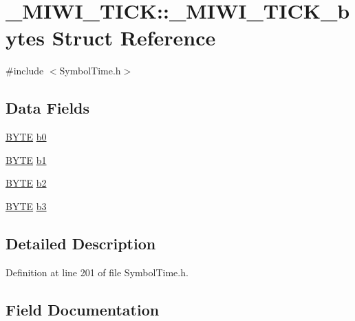 \hypertarget{struct___m_i_w_i___t_i_c_k_1_1___m_i_w_i___t_i_c_k__bytes}{}\section{\+\_\+\+M\+I\+W\+I\+\_\+\+T\+I\+C\+K\+:\+:\+\_\+\+M\+I\+W\+I\+\_\+\+T\+I\+C\+K\+\_\+bytes Struct Reference}
\label{struct___m_i_w_i___t_i_c_k_1_1___m_i_w_i___t_i_c_k__bytes}


{\ttfamily \#include $<$Symbol\+Time.\+h$>$}

\subsection*{Data Fields}
\begin{DoxyCompactItemize}
\item 
\hyperlink{_generic_type_defs_8h_a4ae1dab0fb4b072a66584546209e7d58}{B\+Y\+T\+E} \hyperlink{struct___m_i_w_i___t_i_c_k_1_1___m_i_w_i___t_i_c_k__bytes_aef951d5479618d6a541ce506ccf9c1f9}{b0}
\item 
\hyperlink{_generic_type_defs_8h_a4ae1dab0fb4b072a66584546209e7d58}{B\+Y\+T\+E} \hyperlink{struct___m_i_w_i___t_i_c_k_1_1___m_i_w_i___t_i_c_k__bytes_a9bf81a2bd99cdabfcb59243e784de83f}{b1}
\item 
\hyperlink{_generic_type_defs_8h_a4ae1dab0fb4b072a66584546209e7d58}{B\+Y\+T\+E} \hyperlink{struct___m_i_w_i___t_i_c_k_1_1___m_i_w_i___t_i_c_k__bytes_a89c73e8b4c7d873412018ddf97ee9d7d}{b2}
\item 
\hyperlink{_generic_type_defs_8h_a4ae1dab0fb4b072a66584546209e7d58}{B\+Y\+T\+E} \hyperlink{struct___m_i_w_i___t_i_c_k_1_1___m_i_w_i___t_i_c_k__bytes_afa8f428b9dee4c9b8c3f2fc1fcc5b329}{b3}
\end{DoxyCompactItemize}


\subsection{Detailed Description}


Definition at line 201 of file Symbol\+Time.\+h.



\subsection{Field Documentation}
\hypertarget{struct___m_i_w_i___t_i_c_k_1_1___m_i_w_i___t_i_c_k__bytes_aef951d5479618d6a541ce506ccf9c1f9}{}
